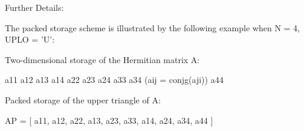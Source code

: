 \begin{DoxyParagraph}{Further Details\+: }
\begin{DoxyVerb}  The packed storage scheme is illustrated by the following example
  when N = 4, UPLO = 'U':

  Two-dimensional storage of the Hermitian matrix A:

     a11 a12 a13 a14
         a22 a23 a24
             a33 a34     (aij = conjg(aji))
                 a44

  Packed storage of the upper triangle of A:

  AP = [ a11, a12, a22, a13, a23, a33, a14, a24, a34, a44 ]\end{DoxyVerb}
 
\end{DoxyParagraph}
